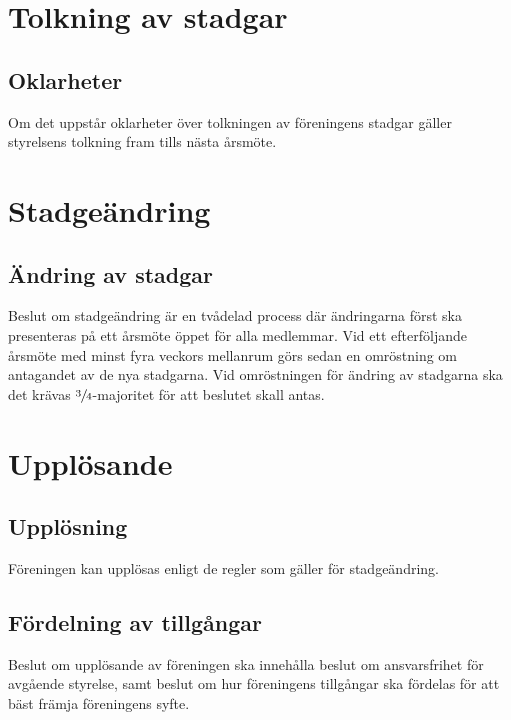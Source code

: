 \documentclass[11pt,a4paper]{article}
\begin{document}
\section{Tolkning av stadgar}

\subsection{Oklarheter}
Om det uppstår oklarheter över tolkningen av föreningens stadgar gäller styrelsens tolkning fram tills nästa årsmöte.



\section{Stadgeändring}

\subsection{Ändring av stadgar}
Beslut om stadgeändring är en tvådelad process där ändringarna först ska
presenteras på ett årsmöte öppet för alla medlemmar. Vid ett efterföljande
årsmöte med minst fyra veckors mellanrum görs sedan en omröstning om
antagandet av de nya stadgarna. Vid omröstningen för ändring av stadgarna 
ska det krävas \(\sfrac{3}{4}\)-majoritet för att beslutet skall antas.



\section{Upplösande}

\subsection{Upplösning}
Föreningen kan upplösas enligt de regler som gäller för stadgeändring.
\subsection{Fördelning av tillgångar}
Beslut om upplösande av föreningen ska innehålla beslut om
ansvarsfrihet för avgående styrelse, samt beslut om hur föreningens
tillgångar ska fördelas för att bäst främja föreningens syfte.
\end{document}
